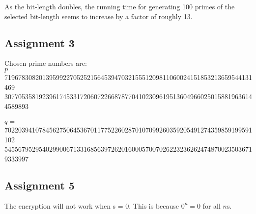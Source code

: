 \documentclass[11pt,a4paper]{article}
\begin{document}
As the bit-length doubles, the running time for generating 100 primes of the selected bit-length seems to increase by a factor of roughly 13.

\subsection{Assignment 3}
Chosen prime numbers are: \\
$p = $719678308201395992270525215645394703215551209811060024151853213659544131469\\3077053581923961745331720607226687877041023096195136049660250158819636144589893\\\\
$q = $702203941078456275064536701177522602870107099260359205491274359859199591102\\5455679529540299006713316856397262016000570070262232362624748700235036719333997
\subsection{Assignment 5}

The encryption will not work when s = 0. This is because $0^n = 0$ for all $n$s.
\end{document}
